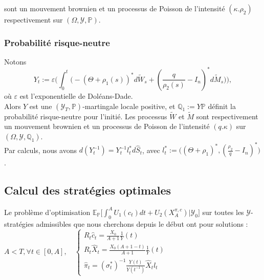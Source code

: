 \documentclass[11pt,letterpaper]{article}
\begin{document}
sont un mouvement brownien et un processus de Poisson de l'intensité $(\kappa.\rho_2)$ respectivement sur $(\Omega, \mathcal{Y}, \mathbb{P})$.\\

\subsubsection{Probabilité risque-neutre}
Notons
\begin{equation*}
Y_t := \varepsilon \Big(\displaystyle \int_{0}^{t} \big(-(\Theta + \rho_1(s))^* d\widetilde{W}_s + (\frac{q}{\rho_2(s)} - I_n )^* d\widetilde{M}_s\big)\Big), 
\end{equation*}
où $\varepsilon$ est l'exponentielle de Doléans-Dade. \\

Alors $Y$ est une $(\mathcal{Y}_T, \mathbb{P})$-martingale locale positive, et $\mathbb{Q}_1:= Y \mathbb{P}$ définit la probabilité risque-neutre pour l'initié. Les processus $\widetilde{W}$ et $\widetilde{M}$ sont respectivement un mouvement brownien et un processus de Poisson de l'intensité $(q.\kappa)$ sur $(\Omega, \mathcal{Y}, \mathbb{Q}_1)$.\\

Par calculs, nous avons $\displaystyle d(Y^{-1}_t) = Y^{-1}_t l^*_t d\widehat{S}_t$, avec $\displaystyle l^*_t := \big((\Theta + \rho_1)^*, (\frac{\rho_2}{q} - I_n)^*\big)$.\\

\subsection{Calcul des stratégies optimales}
Le problème d'optimisation $ \mathbb{E}_{\mathbb{P}} \Big[ \displaystyle \int_{0}^{A} U_1(c_t)dt + U_2(X_A^{\pi, c})\Big|\mathcal{Y}_0\Big]$ sur toutes les $\mathcal{Y}$-stratégies admissibles que nous cherchons depuis le début ont pour solutions : \\
 
$A<T, \forall t \in [0, A], \quad \begin{cases}
\displaystyle R_t \widehat{c}_t = \frac{X_0}{A+1} \frac{1}{Y}(t)\\
\displaystyle R_t \widehat{X}_t = \frac{X_0(A+1-t)}{A+1}\frac{1}{Y}(t)\\
\displaystyle \widehat{\pi}_t = (\sigma^*_t)^{-1}\frac{Y(t)}{Y(t^{-1})}\widehat{X}_t l_t
\end{cases}$
\end{document}
